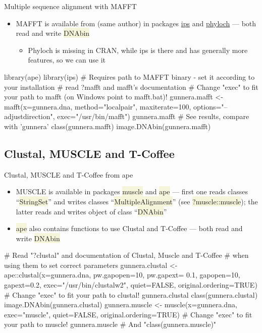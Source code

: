 \documentclass[compress, xelatex, 11pt, xcolor=svgnames, aspectratio=169,
	hyperref={
		bookmarks=true,
		unicode=true,
		colorlinks=true,
		pdftitle={Molecular data in R},
		plainpages=false,
		pdfauthor={Vojtech Zeisek},
		pdfsubject={Course about phylogeny and evolution in R},
		pdfcreator={XeLaTeX},
		pdfkeywords={R, evolution, phylogeny, molecular data},
		linkcolor=Crimson, %
		anchorcolor=Magenta, %
		citecolor=Magenta, %
		filecolor=Magenta, %
		menucolor=Magenta, %
		urlcolor=DodgerBlue, %
		},
	url={hyphens, lowtilde} %
	]{beamer}
\renewcommand{\texttt}[1]{\colorbox{Beige}{{\ttfamily #1}}}
\begin{document}
\begin{frame}[fragile]{Multiple sequence alignment with MAFFT}
	\begin{itemize}
		\item MAFFT is available from (same author) in packages \href{https://CRAN.R-project.org/package=ips}{ips} and \href{http://www.christophheibl.de/Rpackages.html}{phyloch} --- both read and write \texttt{DNAbin}
		\begin{itemize}
			\item Phyloch is missing in CRAN, while ips is there and has generally more features, so we can use it
		\end{itemize}
	\end{itemize}
	\begin{spluscode}
    library(ape)
    library(ips)
    # Requires path to MAFFT binary - set it according to your installation
    # read ?mafft and mafft's documentation
    # Change "exec" to fit your path to mafft (on Windows point to mafft.bat)!
    gunnera.mafft <- mafft(x=gunnera.dna, method="localpair", maxiterate=100,
      options="--adjustdirection", exec="/usr/bin/mafft")
    gunnera.mafft # See results, compare with 'gunnera'
    class(gunnera.mafft)
    image.DNAbin(gunnera.mafft)
	\end{spluscode}
\end{frame}

\subsection{Clustal, MUSCLE and T-Coffee}

\begin{frame}[fragile]{Clustal, MUSCLE and T-Coffee from ape}
	\begin{itemize}
		\item MUSCLE is available in packages \texttt{muscle} and \texttt{ape} --- first one reads classes \enquote{\texttt{*StringSet}} and writes classes \enquote{\texttt{*MultipleAlignment}} (see \texttt{?muscle::muscle}); the latter reads and writes object of class \enquote{\texttt{DNAbin}}
		\item \texttt{ape} also contains functions to use Clustal and T-Coffee --- both read and write \texttt{DNAbin}
	\end{itemize}
	\begin{spluscode}
    # Read "?clustal" and documentation of Clustal, Muscle and T-Coffee
    # when using them to set correct parameters
    gunnera.clustal <- ape::clustal(x=gunnera.dna, pw.gapopen=10, pw.gapext=
      0.1, gapopen=10, gapext=0.2, exec="/usr/bin/clustalw2", quiet=FALSE,
      original.ordering=TRUE) # Change "exec" to fit your path to clustal!
    gunnera.clustal
    class(gunnera.clustal)
    image.DNAbin(gunnera.clustal)
    gunnera.muscle <- muscle(x=gunnera.dna, exec="muscle", quiet=FALSE,
      original.ordering=TRUE) # Change "exec" to fit your path to muscle!
    gunnera.muscle # And "class(gunnera.muscle)"
	\end{spluscode}
\end{frame}
\end{document}
